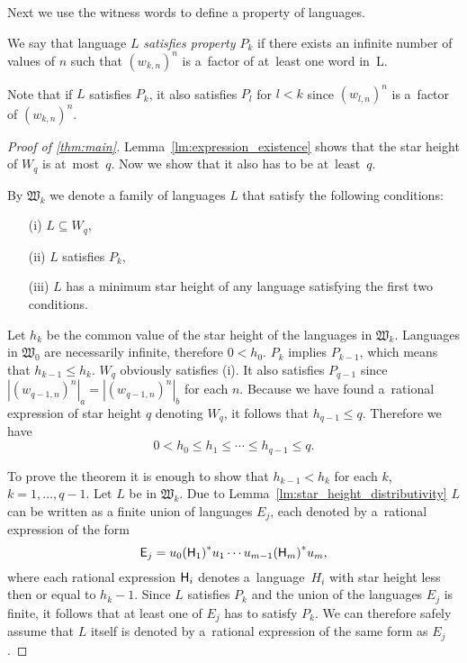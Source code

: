 Next we use the witness words to define a property of languages.

\begin{defn}
    We say that language $L$ \emph{satisfies property $P_k$} if there exists an infinite number of values of $n$ such that ${(w_{k,n})}^n$ is a~factor of at~least one word in~L.
\end{defn}

Note that if $L$ satisfies $P_k$, it also satisfies $P_l$ for $l < k$ since ${(w_{l,n})}^n$ is a~factor of ${(w_{k,n})}^n$.

\begin{proof}[Proof of \autoref*{thm:main}]
    Lemma~\ref*{lm:expression_existence} shows that the star height of $W_q$ is at~most~$q$. Now we show that it also has to be at~least~$q$.

    By $\mathfrak{W}_k$ we denote a family of languages $L$ that satisfy the following conditions:
    \begin{itemize}
        \item[(i)] $L \subseteq W_q$,
        \item[(ii)] $L$ satisfies $P_k$,
        \item[(iii)] $L$ has a minimum star height of any language satisfying the first two conditions.
    \end{itemize}

    Let $h_k$ be the common value of the star height of the languages in $\mathfrak{W}_k$. Languages in $\mathfrak{W}_0$ are necessarily infinite, therefore $0 < h_0$. $P_k$ implies $P_{k-1}$, which means that  $h_{k-1} \leq h_k$. $W_q$ obviously satisfies (i). It also satisfies $P_{q-1}$ since $|{(w_{q-1,n})}^n|_a = |{(w_{q-1,n})}^n|_b$ for each $n$. Because we have found a~rational expression of star height $q$ denoting $W_q$, it follows that $h_{q-1} \leq q$. Therefore we have
    \[
        0 < h_0 \leq h_1 \leq \dotsb \leq h_{q-1} \leq q.
    \]

    To prove the theorem it is enough to show that $h_{k-1} < h_k$ for each $k$, $k=1, \dotsc, q-1$. Let $L$ be in $\mathfrak{W}_k$. Due to Lemma~\ref*{lm:star_height_distributivity} $L$ can be written as a finite union of languages $E_j$, each denoted by a~rational expression of the form
    \[
        {\mathsf{E}}_j = u_0{({\mathsf{H}}_1)}^*u_1 \dotsm u_{m-1}{({\mathsf{H}}_m)}^*u_m,
    \]
    where each rational expression ${\mathsf{H}}_i$ denotes a~language~$H_i$ with star height less then or equal to $h_k-1$. Since $L$ satisfies $P_k$ and the union of the languages $E_j$ is finite, it follows that at least one of $E_j$ has to satisfy $P_k$. We can therefore safely assume that $L$ itself is denoted by a~rational expression of the same form as $E_j$.


\end{proof}
